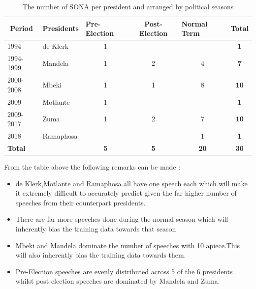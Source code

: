 \documentclass[]{article}
\begin{document}
\begin{table}[h]
\centering
\begin{tabular}{|l|l|c|c|c|c|}
\hline
\multicolumn{1}{|c|}{Period} & Presidents & \multicolumn{1}{l|}{Pre-Election} & Post-Election & \multicolumn{1}{l|}{Normal Term} & \multicolumn{1}{l|}{\textbf{Total}} \\ \hline
1994                         & de-Klerk   & 1                                 &               &                                  & \textbf{1}                          \\ \hline
1994-1999                    & Mandela    & 1                                 & 2             & 4                                & \textbf{7}                          \\ \hline
2000-2008                    & Mbeki      & 1                                 & 1             & 8                                & \textbf{10}                         \\ \hline
2009                         & Motlante   & 1                                 &               &                                  & \textbf{1}                          \\ \hline
2009-2017                    & Zuma       & 1                                 & 2             & 7                                & \textbf{10}                         \\ \hline
2018                         & Ramaphosa  &                                   &               & 1                                & \textbf{1}                          \\ \hline
\textbf{Total}               &            & \textbf{5}                        & \textbf{5}    & \textbf{20}                      & \textbf{30}                         \\ \hline
\end{tabular}
\caption{The number of SONA per president and arranged by political seasons}
\label{my-label}
\end{table}

From the table above the following remarks can be made :

\begin{itemize}
\item de Klerk,Motlante and Ramaphosa all have one speech each which will make it extremely difficult to accurately predict given the far higher number of speeches from their counterpart presidents.
\item There are far more speeches done during the normal season which will inherently bias the training data towards that season
\item Mbeki and Mandela dominate the number of speeches with 10 apiece.This will also inherently bias the training data towards them.
\item Pre-Election speeches are evenly distributed across 5 of the 6 presidents whilst post election speeches are dominated by Mandela and Zuma.
\end{itemize}
\end{document}
